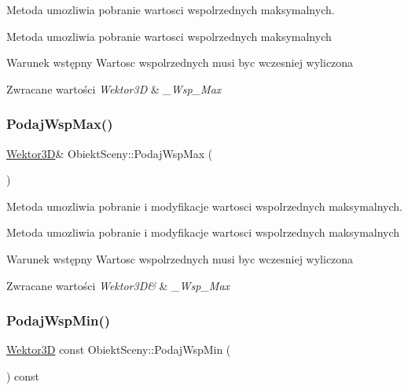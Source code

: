 Metoda umozliwia pobranie wartosci wspolrzednych maksymalnych. 

Metoda umozliwia pobranie wartosci wspolrzednych maksymalnych \begin{DoxyPrecond}{Warunek wstępny}
Wartosc wspolrzednych musi byc wczesniej wyliczona 
\end{DoxyPrecond}

\begin{DoxyRetVals}{Zwracane wartości}
{\em Wektor3D} & {\itshape \+\_\+\+Wsp\+\_\+\+Max} \\
\hline
\end{DoxyRetVals}
\mbox{\label{classObiektSceny_a5a66f5506b5e30e47040d31c8b751c7a}} 
\subsubsection{\texorpdfstring{Podaj\+Wsp\+Max()}{PodajWspMax()}\hspace{0.1cm}{\footnotesize\ttfamily [2/2]}}
{\footnotesize\ttfamily \hyperlink{classSWektor}{Wektor3D}\& Obiekt\+Sceny\+::\+Podaj\+Wsp\+Max (\begin{DoxyParamCaption}{ }\end{DoxyParamCaption})\hspace{0.3cm}{\ttfamily [inline]}}



Metoda umozliwia pobranie i modyfikacje wartosci wspolrzednych maksymalnych. 

Metoda umozliwia pobranie i modyfikacje wartosci wspolrzednych maksymalnych \begin{DoxyPrecond}{Warunek wstępny}
Wartosc wspolrzednych musi byc wczesniej wyliczona 
\end{DoxyPrecond}

\begin{DoxyRetVals}{Zwracane wartości}
{\em Wektor3\+D\&} & {\itshape \+\_\+\+Wsp\+\_\+\+Max} \\
\hline
\end{DoxyRetVals}
\mbox{\label{classObiektSceny_a81f3173a7b40fdf30fd0488e470b86a6}} 
\subsubsection{\texorpdfstring{Podaj\+Wsp\+Min()}{PodajWspMin()}\hspace{0.1cm}{\footnotesize\ttfamily [1/2]}}
{\footnotesize\ttfamily \hyperlink{classSWektor}{Wektor3D} const Obiekt\+Sceny\+::\+Podaj\+Wsp\+Min (\begin{DoxyParamCaption}{ }\end{DoxyParamCaption}) const\hspace{0.3cm}{\ttfamily [inline]}}



